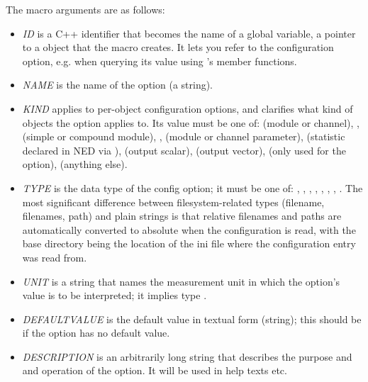 The macro arguments are as follows:
\begin{itemize}
  \item \textit{ID} is a C++ identifier that becomes the name of a global
        variable, a pointer to a  object that the
        macro creates. It lets you refer to the configuration option, 
        e.g. when querying its value using 's member 
        functions.
  \item \textit{NAME} is the name of the option (a string).
  \item \textit{KIND} applies to per-object configuration options, and 
        clarifies what kind of objects the option applies to. Its value 
        must be one of:  (module or channel),
        ,  (simple or compound module),
        ,  (module or channel
        parameter),  (statistic declared in NED
        via ),  (output scalar),
         (output vector), 
        (only used for the  option), 
        (anything else).
  \item \textit{TYPE} is the data type of the config option; it must be one of:
        , , , ,
        , , , .
        The most significant difference between filesystem-related types
        (filename, filenames, path) and plain strings is that relative
        filenames and paths are automatically converted to absolute
        when the configuration is read, with the base directory being the
        location of the ini file where the configuration entry was read from.
  \item \textit{UNIT} is a string that names the measurement unit in which
        the option's value is to be interpreted; it implies type .
  \item \textit{DEFAULTVALUE} is the default value in textual form (string);
        this should be  if the option has no default value.
  \item \textit{DESCRIPTION} is an arbitrarily long string that describes
        the purpose and and operation of the option. It will be used in
        help texts etc.
\end{itemize}

